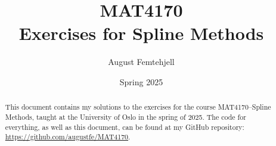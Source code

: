 \documentclass[
    a4paper,
    12pt,
]{article}
\title{
    MAT4170\\
    \small{Exercises for Spline Methods}
}
\author{August Femtehjell}
\date{Spring 2025}
\theoremstyle{exerciseStyle}
\theoremstyle{solutionStyle}
\theoremstyle{breaktheorem}
\numberwithin{equation}{section}
\begin{document}
\maketitle

\tableofcontents

\begin{abstract}
    This document contains my solutions to the exercises for the course MAT4170--Spline Methods, taught at the University of Oslo in the spring of 2025.
    The code for everything, as well as this document, can be found at my GitHub repository: \url{https://github.com/augustfe/MAT4170}.
\end{abstract}








\end{document}
